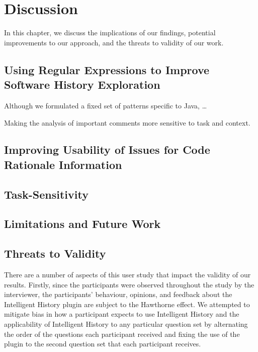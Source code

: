 \chapter{Discussion}
\label{ch:Discussion}

In this chapter, we discuss the implications of our findings,
potential improvements to our approach, and the threats to validity of our work.


\section{Using Regular Expressions to Improve Software History Exploration}

Although we formulated a fixed set of patterns specific to Java, \dots {}

Making the analysis of important comments more sensitive to task and context.


\section{Improving Usability of Issues for Code Rationale Information}


\section{Task-Sensitivity}


\section{Limitations and Future Work}


\section{Threats to Validity}

There are a number of aspects of this user study that impact the validity of our results.
Firstly, since the participants were observed throughout the study by the interviewer, the participants' behaviour, opinions, and feedback about the Intelligent History plugin are subject to the Hawthorne effect.
We attempted to mitigate bias in how a participant expects to use Intelligent History and the applicability of Intelligent History to any particular question set 
by alternating the order of the questions each participant received and 
fixing the use of the plugin to the second question set that each participant receives.

